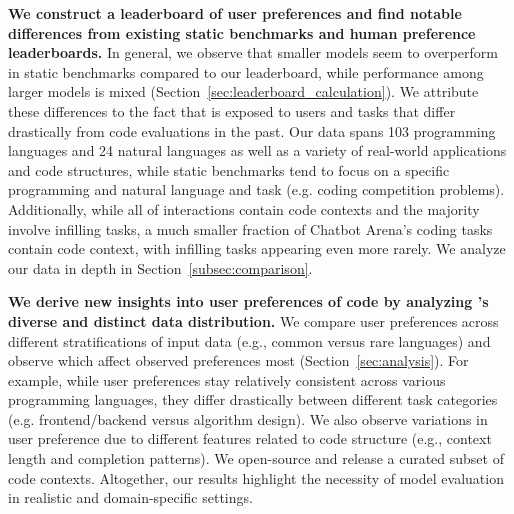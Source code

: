 \textbf{We construct a leaderboard of user preferences and find notable differences from existing static benchmarks and human preference leaderboards.}
In general, we observe that smaller models seem to overperform in static benchmarks compared to our leaderboard, while performance among larger models is mixed (Section~\ref{sec:leaderboard_calculation}).
We attribute these differences to the fact that \systemName is exposed to users and tasks that differ drastically from code evaluations in the past. 
Our data spans 103 programming languages and 24 natural languages as well as a variety of real-world applications and code structures, while static benchmarks tend to focus on a specific programming and natural language and task (e.g. coding competition problems).
Additionally, while all of \systemName interactions contain code contexts and the majority involve infilling tasks, a much smaller fraction of Chatbot Arena's coding tasks contain code context, with infilling tasks appearing even more rarely. 
We analyze our data in depth in Section~\ref{subsec:comparison}.



\textbf{We derive new insights into user preferences of code by analyzing \systemName's diverse and distinct data distribution.}
We compare user preferences across different stratifications of input data (e.g., common versus rare languages) and observe which affect observed preferences most (Section~\ref{sec:analysis}).
For example, while user preferences stay relatively consistent across various programming languages, they differ drastically between different task categories (e.g. frontend/backend versus algorithm design).
We also observe variations in user preference due to different features related to code structure 
(e.g., context length and completion patterns).
We open-source \systemName and release a curated subset of code contexts.
Altogether, our results highlight the necessity of model evaluation in realistic and domain-specific settings.




